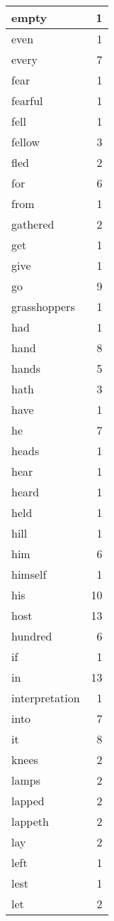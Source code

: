 \begin{center}
\begin{longtable}{l|r}
empty & 1\\ \hline 
even & 1\\ \hline 
every & 7\\ \hline 
fear & 1\\ \hline 
fearful & 1\\ \hline 
fell & 1\\ \hline 
fellow & 3\\ \hline 
fled & 2\\ \hline 
for & 6\\ \hline 
from & 1\\ \hline 
gathered & 2\\ \hline 
get & 1\\ \hline 
give & 1\\ \hline 
go & 9\\ \hline 
grasshoppers & 1\\ \hline 
had & 1\\ \hline 
hand & 8\\ \hline 
hands & 5\\ \hline 
hath & 3\\ \hline 
have & 1\\ \hline 
he & 7\\ \hline 
heads & 1\\ \hline 
hear & 1\\ \hline 
heard & 1\\ \hline 
held & 1\\ \hline 
hill & 1\\ \hline 
him & 6\\ \hline 
himself & 1\\ \hline 
his & 10\\ \hline 
host & 13\\ \hline 
hundred & 6\\ \hline 
if & 1\\ \hline 
in & 13\\ \hline 
interpretation & 1\\ \hline 
into & 7\\ \hline 
it & 8\\ \hline 
knees & 2\\ \hline 
lamps & 2\\ \hline 
lapped & 2\\ \hline 
lappeth & 2\\ \hline 
lay & 2\\ \hline 
left & 1\\ \hline 
lest & 1\\ \hline 
let & 2\\ \hline 

\end{longtable}
\end{center}
